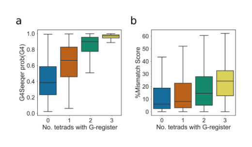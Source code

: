 \documentclass[12pt,a4paper,]{report}
\let\origfigure=\figure
\let\endorigfigure=\endfigure
\renewenvironment{figure}[1][2] {
    \expandafter\origfigure\expandafter[H]
} {
    \endorigfigure
}
\begin{document}
\begin{figure}[htbp]
\centering
\includegraphics[width=\textwidth,height=562pt,keepaspectratio]{chapter_3/figures/g_register.png}
\caption[Scoring of G-register effects by G4Seeqer]{\textbf{Scoring   of   G-register   effects   by   G4Seeqer}   \textbf{a)}   Boxplot   showing   G4Seeqer   scores   for   randomly   generated   3   tetrad   Quadparser   conforming   sequences   with   zero   to   three   additional   Guanines   per   run,   referred   to   by   Harkness   and   Mittermaier   as   G-register.   \textbf{b)}   Boxplot   showing   relationship   between   G-register   and   \%mm   score   in   the   G4Seq   dataset   for   Quadparser   conforming   G4s.   \label{register}}
\end{figure}

\newpage
\end{document}

